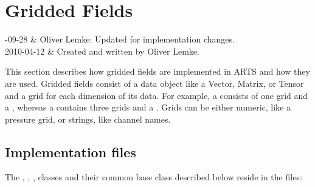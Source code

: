 %
%
\chapter{Gridded Fields}
\label{sec:griddedfields}


%
%
-09-28 & Oliver Lemke: Updated for implementation changes.\\
  2010-04-12 & Created and written by Oliver Lemke.\\
\stophistory




%
%

This section describes how gridded fields are implemented in ARTS and
how they are used. Gridded fields consist of a data object like a
Vector, Matrix, or Tensor and a grid for each dimension of its data.
For example, a  consists of one grid and a
, whereas a  contains three grids
and a . Grids can be either numeric, like a pressure grid,
or strings, like channel names.


\section{Implementation files}
\label{sec:griddedfields:files}

The , ,
,  classes and their common
base class  described below reside in the files:

